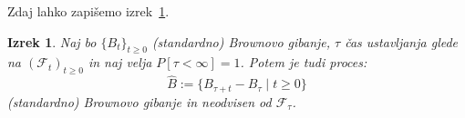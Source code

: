 \documentclass[11pt]{article}
\newcommand{\m}{\mathcal{F}}
\theoremstyle{definition}
\theoremstyle{plain}
\newtheorem{izrek}{Izrek}
\begin{document}
    Zdaj lahko zapišemo izrek~\ref{thm:stopped_brownian}. %
    
    
    \begin{izrek}
        \label{thm:stopped_brownian}
            Naj bo \(\{B_t\}_{t \geq 0}\) (standardno) Brownovo gibanje, \(\tau\) čas ustavljanja glede na
            \((\m_t)_{t \geq 0}\) in naj velja \(P [\tau < \infty] = 1\).
            Potem je tudi proces:
            \[
            \hat{B} := \{B_{\tau+t} - B_\tau \mid t \geq 0\}
            \]
            (standardno) Brownovo gibanje in neodvisen od \(\m_\tau\).
    \end{izrek}




\end{document}
